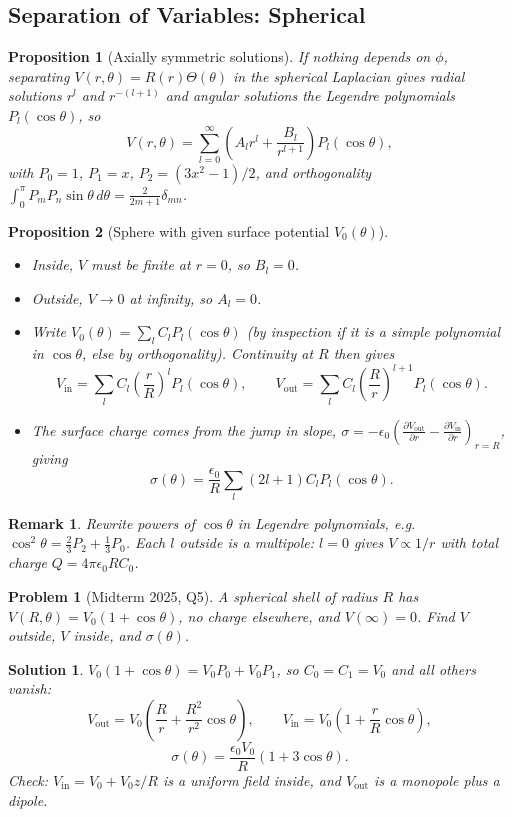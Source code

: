 \documentclass{article}
\newtheorem{problem}{Problem}
\newtheorem{solution}{Solution}
\newtheorem{remark}{Remark}
\newtheorem{proposition}{Proposition}
\begin{document}
\subsection{Separation of Variables: Spherical}
\begin{proposition}[Axially symmetric solutions]
    If nothing depends on $\phi$, separating $V(r,\theta) = R(r)\Theta(\theta)$ in the spherical Laplacian gives radial solutions $r^l$ and $r^{-(l+1)}$ and angular solutions the Legendre polynomials $P_l(\cos\theta)$, so
    \begin{equation}
        V(r,\theta) = \sum_{l=0}^{\infty}\left(A_lr^l + \frac{B_l}{r^{l+1}}\right)P_l(\cos\theta),
    \end{equation}
    with $P_0 = 1$, $P_1 = x$, $P_2 = (3x^2-1)/2$, and orthogonality $\int_0^\pi P_mP_n\sin\theta\,d\theta = \frac{2}{2m+1}\delta_{mn}$.
\end{proposition}
\begin{proposition}[Sphere with given surface potential $V_0(\theta)$]
    \begin{itemize}
        \item Inside, $V$ must be finite at $r = 0$, so $B_l = 0$.
        \item Outside, $V \to 0$ at infinity, so $A_l = 0$.
        \item Write $V_0(\theta) = \sum_l C_lP_l(\cos\theta)$ (by inspection if it is a simple polynomial in $\cos\theta$, else by orthogonality). Continuity at $R$ then gives
        \[V_{\text{in}} = \sum_l C_l\left(\frac{r}{R}\right)^lP_l(\cos\theta), \qquad V_{\text{out}} = \sum_l C_l\left(\frac{R}{r}\right)^{l+1}P_l(\cos\theta).\]
        \item The surface charge comes from the jump in slope, $\sigma = -\epsilon_0\left(\frac{\partial V_{\text{out}}}{\partial r} - \frac{\partial V_{\text{in}}}{\partial r}\right)_{r=R}$, giving
        \[\sigma(\theta) = \frac{\epsilon_0}{R}\sum_l(2l+1)C_lP_l(\cos\theta).\]
    \end{itemize}
\end{proposition}
\begin{remark}
    Rewrite powers of $\cos\theta$ in Legendre polynomials, e.g.\ $\cos^2\theta = \frac{2}{3}P_2 + \frac{1}{3}P_0$. Each $l$ outside is a multipole: $l = 0$ gives $V \propto 1/r$ with total charge $Q = 4\pi\epsilon_0 RC_0$.
\end{remark}
\begin{problem}[Midterm 2025, Q5]
    A spherical shell of radius $R$ has $V(R,\theta) = V_0(1 + \cos\theta)$, no charge elsewhere, and $V(\infty) = 0$. Find $V$ outside, $V$ inside, and $\sigma(\theta)$.
\end{problem}
\begin{solution}
    $V_0(1+\cos\theta) = V_0P_0 + V_0P_1$, so $C_0 = C_1 = V_0$ and all others vanish:
    \[V_{\text{out}} = V_0\left(\frac{R}{r} + \frac{R^2}{r^2}\cos\theta\right), \qquad V_{\text{in}} = V_0\left(1 + \frac{r}{R}\cos\theta\right),\]
    \[\sigma(\theta) = \frac{\epsilon_0V_0}{R}\left(1 + 3\cos\theta\right).\]
    Check: $V_{\text{in}} = V_0 + V_0z/R$ is a uniform field inside, and $V_{\text{out}}$ is a monopole plus a dipole.
\end{solution}
\end{document}
